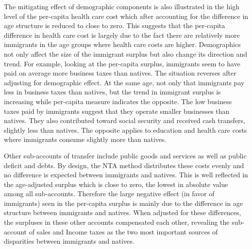 \vspace{0.7em}\par
The mitigating effect of demographic components is also illustrated in the high level of the per-capita health care cost which after accounting for the difference in age structure is reduced to close to zero.
This suggests that the per-capita difference in health care cost is largely due to the fact there are relatively more immigrants in the age groups where health care costs are higher.
Demographics not only affect the size of the immigrant surplus but also change its direction and trend.
For example, looking at the per-capita surplus, immigrants seem to have paid on average more business taxes than natives.
The situation reverses after adjusting for demographic effect.
At the same age, not only that immigrants pay less in business taxes than natives, but the trend in immigrant surplus is increasing while per-capita measure indicates the opposite.
The low business taxes paid by immigrants suggest that they operate smaller businesses than natives.
They also contributed toward social security and received cash transfers, slightly less than natives.
The opposite applies to education and health care costs where immigrants consume slightly more than natives.

\vspace{0.7em}\par
Other sub-accounts of transfer include public goods and services as well as public deficit and debts.
By design, the NTA method distributes these costs evenly and no difference is expected between immigrants and natives.
This is well reflected in the age-adjusted surplus which is close to zero, the lowest in absolute value among all sub-accounts.
Therefore the large negative effect (in favor of immigrants) seen in the per-capita surplus is mainly due to the difference in age structure between immigrants and natives.
When adjusted for these differences, the surpluses in these other accounts compensated each other, revealing the sub-account of sales and Income taxes as the two most important sources of disparities between immigrants and natives.

